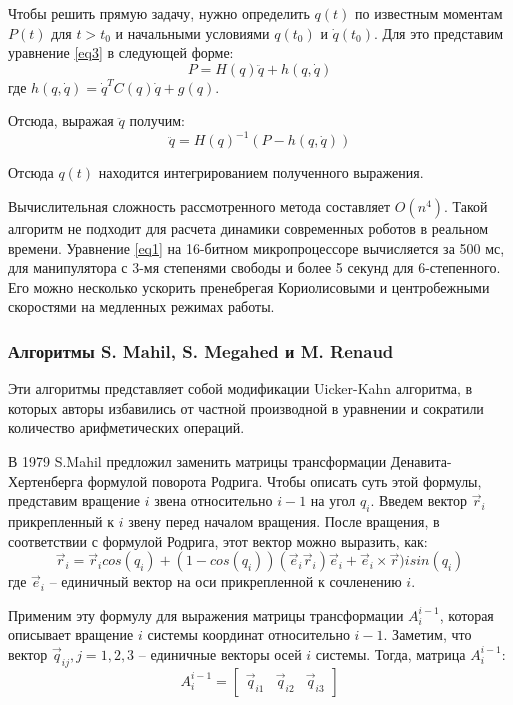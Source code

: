 Чтобы решить прямую задачу, нужно определить $q(t)$ по известным моментам $P(t)$ для $t > t_0$ и начальными условиями $q(t_0)$ и $\dot q(t_0)$. Для это представим уравнение \ref{eq3} в следующей форме:
\begin{equation}
P = H(q) \ddot q + h(q, \dot q)
\end{equation}
где $h(q, \dot q) = \dot q^T C(q) \dot q + g(q)$.

Отсюда, выражая $\ddot q$ получим:
\begin{equation}
\ddot q = H(q)^{-1} (P - h(q, \dot q))
\end{equation}

Отсюда $q(t)$ находится интегрированием полученного выражения.

Вычислительная сложность рассмотренного метода составляет $O(n^4)$. Такой алгоритм не подходит для расчета динамики современных роботов в реальном времени. Уравнение \ref{eq1} на 16-битном микропроцессоре вычисляется за 500 мс, для манипулятора с 3-мя степенями свободы и более 5 секунд для 6-степенного. Его можно несколько ускорить пренебрегая Кориолисовыми и центробежными скоростями на медленных режимах работы.

\subsubsection{Алгоритмы S. Mahil, S. Megahed и M. Renaud}
Эти алгоритмы представляет собой модификации Uicker-Kahn алгоритма, в которых авторы избавились от частной производной в уравнении и сократили количество арифметических операций.

В 1979 S.Mahil предложил заменить матрицы трансформации Денавита-Хертенберга формулой поворота Родрига. Чтобы описать суть этой формулы, представим вращение $i$ звена относительно $i-1$ на угол $q_i$. Введем вектор $\vec r_i$ прикрепленный к $i$ звену перед началом вращения. После вращения, в соответствии с формулой Родрига, этот вектор можно выразить, как:
\begin{equation}
\vec r_i = \vec r_i cos (q_i) + (1 - cos(q_i))(\vec e_i \vec r_i) \vec e_i + \vec e_i \times \vec r)i sin (q_i)
\end{equation}
где $\vec e_i$ -- единичный вектор на оси прикрепленной к сочленению $i$.
 
Применим эту формулу для выражения матрицы трансформации $A_i^{i-1}$, которая описывает вращение $i$ системы координат относительно $i-1$. Заметим, что вектор $\vec q_{ij}, j=1,2,3$ -- единичные векторы осей $i$ системы. Тогда, матрица $A_i^{i-1}$:
\begin{equation}
A_i^{i-1} = 
\begin{bmatrix}
\vec q_{i1} & \vec q_{i2} & \vec q_{i3}
\end{bmatrix}
\end{equation}

